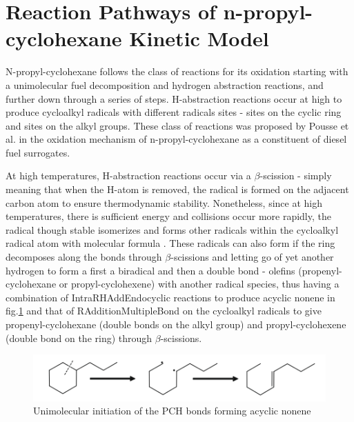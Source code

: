 \newpage

\section{Reaction Pathways of n-propyl-cyclohexane Kinetic Model}
N-propyl-cyclohexane follows the class of reactions for its oxidation starting with a unimolecular fuel decomposition and hydrogen abstraction reactions, and further down through a series of steps. H-abstraction reactions occur at high to produce cycloalkyl radicals with different radicals sites - sites on the cyclic ring and sites on the alkyl groups. These class of reactions was proposed by Pousse et al.\cite{Pousse2010LeanN-Propylcyclohexane} in the oxidation mechanism of n-propyl-cyclohexane as a constituent of diesel fuel surrogates. 

At high temperatures, H-abstraction reactions occur via a $\beta$-scission - simply meaning that when the H-atom is removed, the radical is formed on the adjacent carbon atom to ensure thermodynamic stability. Nonetheless, since at high temperatures, there is sufficient energy and collisions occur more rapidly, the radical though stable isomerizes and forms other radicals within the cycloalkyl radical atom with molecular formula . These radicals can also form if the ring decomposes along the  bonds through $\beta$-scissions and letting go of yet another hydrogen to form a first a biradical and then a double bond - olefins (propenyl-cyclohexane or propyl-cyclohexene) with another radical species, thus having a combination of Intra\textunderscore RH\textunderscore Add\textunderscore Endocyclic reactions to produce acyclic nonene in fig.\ref{fig:nonene } and that of R\textunderscore Addition\textunderscore MultipleBond on the cycloalkyl radicals to give propenyl-cyclohexane (double bonds on the alkyl group) and propyl-cyclohexene (double bond on the ring) through $\beta$-scissions.
  
  
  \begin{figure}[!htp]
      \centering
      \includegraphics[keepaspectratio]{images/nonene.png}
      \caption{Unimolecular initiation of the PCH bonds forming acyclic nonene \cite{Pousse2010LeanN-Propylcyclohexane}}
      \label{fig:nonene }
  \end{figure}
  
